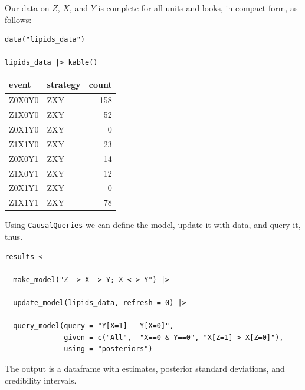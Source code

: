 \documentclass[
  article]{jss}
\begin{document}
Our data on \(Z\), \(X\), and \(Y\) is complete for all units and looks,
in compact form, as follows:

\begin{verbatim}
data("lipids_data")

lipids_data |> kable()
\end{verbatim}

\begin{longtable}[]{@{}llr@{}}
\toprule\noalign{}
event & strategy & count \\
\midrule\noalign{}
\endhead
\bottomrule\noalign{}
\endlastfoot
Z0X0Y0 & ZXY & 158 \\
Z1X0Y0 & ZXY & 52 \\
Z0X1Y0 & ZXY & 0 \\
Z1X1Y0 & ZXY & 23 \\
Z0X0Y1 & ZXY & 14 \\
Z1X0Y1 & ZXY & 12 \\
Z0X1Y1 & ZXY & 0 \\
Z1X1Y1 & ZXY & 78 \\
\end{longtable}

Using \texttt{CausalQueries} we can define the model, update it with
data, and query it, thus.

\begin{verbatim}
results <- 
  
  make_model("Z -> X -> Y; X <-> Y") |>
  
  update_model(lipids_data, refresh = 0) |>
  
  query_model(query = "Y[X=1] - Y[X=0]",
              given = c("All",  "X==0 & Y==0", "X[Z=1] > X[Z=0]"),
              using = "posteriors") 
\end{verbatim}

The output is a dataframe with estimates, posterior standard deviations,
and credibility intervals.
\end{document}
